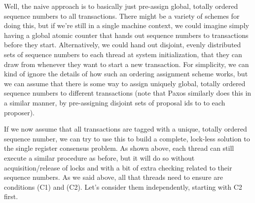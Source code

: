 \documentclass[10pt,a4paper]{article}
\begin{document}
Well, the naive approach is to basically just pre-assign global, totally ordered sequence numbers to all transactions. There might be a variety of schemes for doing this, but if we're still in a single machine context, we could imagine simply having a global atomic counter that hands out sequence numbers to transactions before they start. Alternatively, we could hand out disjoint, evenly distributed sets of sequence numbers to each thread at system initialization, that they can draw from whenever they want to start a new transaction. For simplicity, we can kind of ignore the details of how such an ordering assignment scheme works, but we can assume that there is some way to assign uniquely global, totally ordered sequence numbers to different transactions (note that Paxos similarly does this in a similar manner, by pre-assigning disjoint sets of proposal ids to to each proposer). 

If we now assume that all transactions are tagged with a unique, totally ordered sequence number, we can try to use this to build a complete, lock-less solution to the single register consensus problem. As shown above, each thread can still execute a similar procedure as before, but it will do so without acquisition/release of locks and with a bit of extra checking related to their sequence numbers. As we said above, all that threads need to ensure are conditions (C1) and (C2). Let's consider them independently, starting with C2 first.
\end{document}
